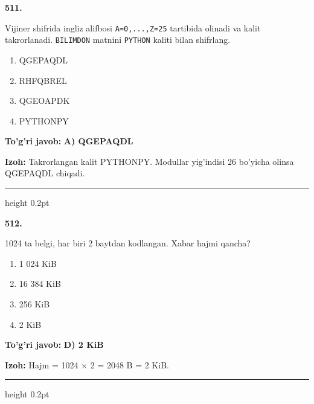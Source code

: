 \documentclass[10pt,a4paper,oneside]{article}
\begin{document}
\noindent\textbf{\color{ink}511.}
\par
Vijiner shifrida ingliz alifbosi \texttt{A=0,...,Z=25} tartibida olinadi va kalit takrorlanadi. \texttt{BILIMDON} matnini \texttt{PYTHON} kaliti bilan shifrlang.
\begin{enumerate}[label=\Alph*),leftmargin=9mm]
\item QGEPAQDL
\item RHFQBREL
\item QGEOAPDK
\item PYTHONPY
\end{enumerate}
\begin{tcolorbox}[enhanced,breakable,colback=teal!4,colframe=teal!50!black,boxrule=0.5pt,arc=1.1mm,left=3mm,right=3mm,top=1.7mm,bottom=1.7mm,before skip=2mm,after skip=2mm]
\textbf{\color{teal}To'g'ri javob:} \textbf{A) QGEPAQDL}
\par\smallskip
\textbf{Izoh:} Takrorlangan kalit PYTHONPY. Modullar yig'indisi 26 bo'yicha olinsa QGEPAQDL chiqadi.
\end{tcolorbox}
\vspace{2mm}\hrule height 0.2pt \vspace{3mm}

\noindent\textbf{\color{ink}512.}
\par
1024 ta belgi, har biri 2 baytdan kodlangan. Xabar hajmi qancha?
\begin{enumerate}[label=\Alph*),leftmargin=9mm]
\item 1 024 KiB
\item 16 384 KiB
\item 256 KiB
\item 2 KiB
\end{enumerate}
\begin{tcolorbox}[enhanced,breakable,colback=teal!4,colframe=teal!50!black,boxrule=0.5pt,arc=1.1mm,left=3mm,right=3mm,top=1.7mm,bottom=1.7mm,before skip=2mm,after skip=2mm]
\textbf{\color{teal}To'g'ri javob:} \textbf{D) 2 KiB}
\par\smallskip
\textbf{Izoh:} Hajm = 1024 \ensuremath{\times} 2 = 2048 B = 2 KiB.
\end{tcolorbox}
\vspace{2mm}\hrule height 0.2pt \vspace{3mm}
\end{document}

